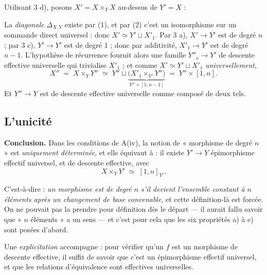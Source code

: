 \documentclass[11pt,a4paper]{article}
\begin{document}
Utilisant 3 d), posons $X' = X \times_{Y} X$ au-dessus de $Y' = X$ :


La \emph{diagonale} $\Delta_{X,Y}$ existe par (1), et par (2) c'est un
isomorphisme sur un sommande direct universel : donc
$X' \simeq Y' \sqcup X'_{1}$. Par 3 a), $X' \to Y'$ est de degré $n$ ; par 3 c),
$Y' \to Y'$ est de degré 1 ; donc par additivité, $X'_{1} \to Y'$ est de degré
$n - 1$. L'hypothèse de récurrence fournit alors une famille
$Y''_{s} \to Y'$ de descente effective universelle qui trivialise $X'_{1}$ ;
et comme $X' \simeq Y' \sqcup X'_{1}$ \emph{universellement},
\[
  X'' \;=\; X \times_{Y} Y'' \;\simeq\; Y'' \sqcup
  \underbrace{\bigl(X'_{1} \times_{Y'} Y''\bigr)}_{\textstyle
  Y'' \times [1, n-1]} \;=\; Y'' \times [1, n] .
\]
Et $Y'' \to Y$ est de descente effective universelle comme composé de deux
tels.

\subsection*{L'unicité}

\textbf{Conclusion.} Dans les conditions de A(iv), la notion de « morphisme de
degré $n$ » est \emph{uniquement déterminée}, et elle équivaut à : il existe
$Y' \to Y$ épimorphisme effectif universel, et de descente effective, avec
\[
  X \times_{Y} Y' \;\simeq\; [1, n]_{Y'} .
\]

C'est-à-dire : \emph{un morphisme est de degré $n$ s'il devient l'ensemble
constant à $n$ éléments après un changement de base convenable}, et cette
définition-là est forcée. On ne pouvait pas la prendre pour définition dès le
départ --- il aurait fallu savoir que « $n$ éléments » a un sens --- et c'est
pour cela que les six propriétés a) à e) sont posées d'abord.

Une \emph{explicitation} accompagne : pour vérifier qu'un $f$ est un morphisme
de descente effective, il suffit de savoir que c'est un épimorphisme effectif
universel, et que les relations d'équivalence sont effectives universelles.

\end{document}
